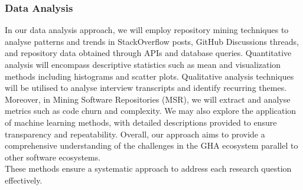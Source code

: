 \documentclass[conference]{IEEEtran}
\begin{document}
        \subsubsection{\textbf{Data Analysis}}
            In our data analysis approach, we will employ repository mining techniques to analyse patterns and trends in StackOverflow posts, GitHub Discussions threads, and repository data obtained through APIs and database queries. Quantitative analysis will encompass descriptive statistics such as mean and visualization methods including histograms and scatter plots. Qualitative analysis techniques will be utilised to analyse interview transcripts and identify recurring themes. Moreover, in Mining Software Repositories (MSR), we will extract and analyse metrics such as code churn and complexity. We may also explore the application of machine learning methods, with detailed descriptions provided to ensure transparency and repeatability. Overall, our approach aims to provide a comprehensive understanding of the challenges in the GHA ecosystem parallel to other software ecosystems. \\

        These methods ensure a systematic approach to address each research question effectively.\\
\end{document}
